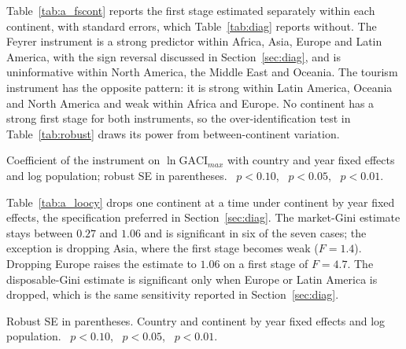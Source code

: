 Table~\ref{tab:a_fscont} reports the first stage estimated separately within each continent, with standard errors, which Table~\ref{tab:diag} reports without. The Feyrer instrument is a strong predictor within Africa, Asia, Europe and Latin America, with the sign reversal discussed in Section~\ref{sec:diag}, and is uninformative within North America, the Middle East and Oceania. The tourism instrument has the opposite pattern: it is strong within Latin America, Oceania and North America and weak within Africa and Europe. No continent has a strong first stage for both instruments, so the over-identification test in Table~\ref{tab:robust} draws its power from between-continent variation.

\begin{table}[H]\centering\caption{First stage estimated separately by continent.}\label{tab:a_fscont}
\begin{threeparttable}\small
\begin{tablenotes}\footnotesize\item Coefficient of the instrument on $\ln\mathrm{GACI}_{max}$ with country and year fixed effects and log population; robust SE in parentheses. \sym{*}~$p<0.10$, \sym{**}~$p<0.05$, \sym{***}~$p<0.01$.\end{tablenotes}\end{threeparttable}\end{table}

Table~\ref{tab:a_loocy} drops one continent at a time under continent by year fixed effects, the specification preferred in Section~\ref{sec:diag}. The market-Gini estimate stays between $0.27$ and $1.06$ and is significant in six of the seven cases; the exception is dropping Asia, where the first stage becomes weak ($F=1.4$). Dropping Europe raises the estimate to $1.06$ on a first stage of $F=4.7$. The disposable-Gini estimate is significant only when Europe or Latin America is dropped, which is the same sensitivity reported in Section~\ref{sec:diag}.

\begin{table}[H]\centering\caption{Leave-one-continent-out under continent by year fixed effects (Feyrer instrument).}\label{tab:a_loocy}
\begin{threeparttable}\small
\begin{tablenotes}\footnotesize\item Robust SE in parentheses. Country and continent by year fixed effects and log population. \sym{*}~$p<0.10$, \sym{**}~$p<0.05$, \sym{***}~$p<0.01$.\end{tablenotes}\end{threeparttable}\end{table}

